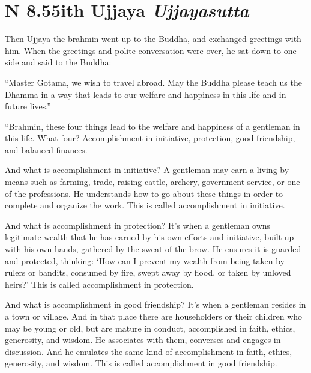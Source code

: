 \documentclass[12pt,openany]{book}%
\newcommand*{\suttatitleacronym}[1]{\smaller[2]{#1}\vspace*{.3em}}
\newcommand*{\suttatitletranslation}[1]{\linebreak{#1}}
\newcommand*{\suttatitleroot}[1]{\linebreak\smaller[2]\itshape{#1}}
\newcommand*{\tocacronym}[1]{\hspace*{-3.3em}{#1}\quad}
\newcommand*{\toctranslation}[1]{#1}
\newcommand*{\tocroot}[1]{(\textit{#1})}
\begin{document}
%
\section*{{\suttatitleacronym AN 8.55}{\suttatitletranslation With Ujjaya }{\suttatitleroot Ujjayasutta}}
\addcontentsline{toc}{section}{\tocacronym{AN 8.55} \toctranslation{With Ujjaya } \tocroot{Ujjayasutta}}

Then Ujjaya the brahmin went up to the Buddha, and exchanged greetings with him. When the greetings and polite conversation were over, he sat down to one side and said to the Buddha: 

“Master Gotama, we wish to travel abroad. May the Buddha please teach us the Dhamma in a way that leads to our welfare and happiness in this life and in future lives.” 

“Brahmin, these four things lead to the welfare and happiness of a gentleman in this life. What four? Accomplishment in initiative, protection, good friendship, and balanced finances. 

And what is accomplishment in initiative? A gentleman may earn a living by means such as farming, trade, raising cattle, archery, government service, or one of the professions. He understands how to go about these things in order to complete and organize the work. This is called accomplishment in initiative. 

And what is accomplishment in protection? It’s when a gentleman owns legitimate wealth that he has earned by his own efforts and initiative, built up with his own hands, gathered by the sweat of the brow. He ensures it is guarded and protected, thinking: ‘How can I prevent my wealth from being taken by rulers or bandits, consumed by fire, swept away by flood, or taken by unloved heirs?’ This is called accomplishment in protection. 

And what is accomplishment in good friendship? It’s when a gentleman resides in a town or village. And in that place there are householders or their children who may be young or old, but are mature in conduct, accomplished in faith, ethics, generosity, and wisdom. He associates with them, converses and engages in discussion. And he emulates the same kind of accomplishment in faith, ethics, generosity, and wisdom. This is called accomplishment in good friendship. 
\end{document}
